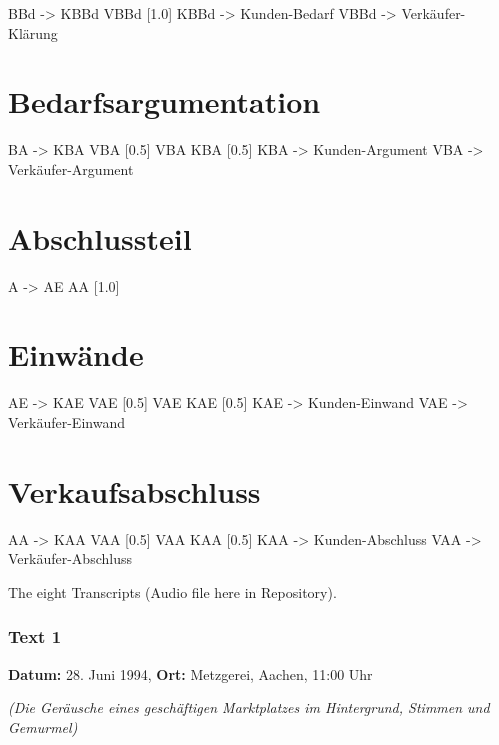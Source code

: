 \documentclass[
]{article}
\begin{document}
BBd -\textgreater{} KBBd VBBd {[}1.0{]} KBBd -\textgreater{}
\textquotesingle Kunden-Bedarf\textquotesingle{} VBBd -\textgreater{}
\textquotesingle Verkäufer-Klärung\textquotesingle{}

\section{Bedarfsargumentation}\label{bedarfsargumentation}

BA -\textgreater{} KBA VBA {[}0.5{]} \textbar{} VBA KBA {[}0.5{]} KBA
-\textgreater{} \textquotesingle Kunden-Argument\textquotesingle{} VBA
-\textgreater{} \textquotesingle Verkäufer-Argument\textquotesingle{}

\section{Abschlussteil}\label{abschlussteil}

A -\textgreater{} AE AA {[}1.0{]}

\section{Einwände}\label{einwuxe4nde}

AE -\textgreater{} KAE VAE {[}0.5{]} \textbar{} VAE KAE {[}0.5{]} KAE
-\textgreater{} \textquotesingle Kunden-Einwand\textquotesingle{} VAE
-\textgreater{} \textquotesingle Verkäufer-Einwand\textquotesingle{}

\section{Verkaufsabschluss}\label{verkaufsabschluss}

AA -\textgreater{} KAA VAA {[}0.5{]} \textbar{} VAA KAA {[}0.5{]} KAA
-\textgreater{} \textquotesingle Kunden-Abschluss\textquotesingle{} VAA
-\textgreater{} \textquotesingle Verkäufer-Abschluss\textquotesingle{}

The eight Transcripts (Audio file here in Repository).

\subsubsection{\texorpdfstring{\textbf{Text 1}}{Text 1}}\label{text-1}

\textbf{Datum:} 28. Juni 1994, \textbf{Ort:} Metzgerei, Aachen, 11:00
Uhr

\emph{(Die Geräusche eines geschäftigen Marktplatzes im Hintergrund,
Stimmen und Gemurmel)}
\end{document}

